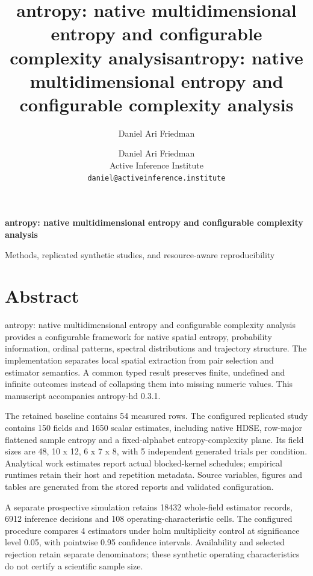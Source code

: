 \documentclass[
  english,
  11pt,
]{article}
\title{antropy: native multidimensional entropy and configurable
complexity analysis}
\author{Daniel Ari Friedman}
\date{}
\title{antropy: native multidimensional entropy and configurable complexity analysis}
\author{Daniel Ari Friedman\\\footnotesize{Active Inference Institute}\\\footnotesize{\texttt{daniel@activeinference.institute}}}
\date{}
\begin{document}
\begin{titlepage}
\centering
\vspace*{2cm}
{\LARGE\bfseries antropy: native multidimensional entropy and configurable complexity analysis\par}
\vspace{0.75em}
{\large Methods, replicated synthetic studies, and resource-aware reproducibility\par}
\vfill
\makeatletter
{\@author\par}
\vspace{1em}
{\@date\par}
\makeatother
\vfill
\end{titlepage}
\thispagestyle{empty}
\tableofcontents
\newpage

\section*{Abstract}\label{abstract}

antropy: native multidimensional entropy and configurable complexity
analysis provides a configurable framework for native spatial entropy,
probability information, ordinal patterns, spectral distributions and
trajectory structure. The implementation separates local spatial
extraction from pair selection and estimator semantics. A common typed
result preserves finite, undefined and infinite outcomes instead of
collapsing them into missing numeric values. This manuscript accompanies
antropy-hd 0.3.1.

The retained baseline contains 54 measured rows. The configured
replicated study contains 150 fields and 1650 scalar estimates,
including native HDSE, row-major flattened sample entropy and a
fixed-alphabet entropy-complexity plane. Its field sizes are 48, 10 x
12, 6 x 7 x 8, with 5 independent generated trials per condition.
Analytical work estimates report actual blocked-kernel schedules;
empirical runtimes retain their host and repetition metadata. Source
variables, figures and tables are generated from the stored reports and
validated configuration.

A separate prospective simulation retains 18432 whole-field estimator
records, 6912 inference decisions and 108 operating-characteristic
cells. The configured procedure compares 4 estimators under holm
multiplicity control at significance level 0.05, with pointwise 0.95
confidence intervals. Availability and selected rejection retain
separate denominators; these synthetic operating characteristics do not
certify a scientific sample size.
\end{document}
